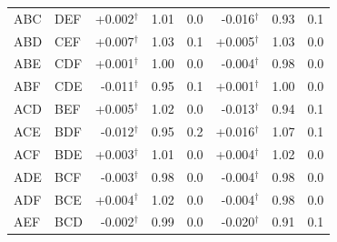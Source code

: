\begin{tabular}{@{}llrrrrrr@{}}
ABC & DEF & +0.002$^\dagger$ & 1.01 & 0.0 & -0.016$^\dagger$ & 0.93 & 0.1 \\
ABD & CEF & +0.007$^\dagger$ & 1.03 & 0.1 & +0.005$^\dagger$ & 1.03 & 0.0 \\
ABE & CDF & +0.001$^\dagger$ & 1.00 & 0.0 & -0.004$^\dagger$ & 0.98 & 0.0 \\
ABF & CDE & -0.011$^\dagger$ & 0.95 & 0.1 & +0.001$^\dagger$ & 1.00 & 0.0 \\
ACD & BEF & +0.005$^\dagger$ & 1.02 & 0.0 & -0.013$^\dagger$ & 0.94 & 0.1 \\
ACE & BDF & -0.012$^\dagger$ & 0.95 & 0.2 & +0.016$^\dagger$ & 1.07 & 0.1 \\
ACF & BDE & +0.003$^\dagger$ & 1.01 & 0.0 & +0.004$^\dagger$ & 1.02 & 0.0 \\
ADE & BCF & -0.003$^\dagger$ & 0.98 & 0.0 & -0.004$^\dagger$ & 0.98 & 0.0 \\
ADF & BCE & +0.004$^\dagger$ & 1.02 & 0.0 & -0.004$^\dagger$ & 0.98 & 0.0 \\
AEF & BCD & -0.002$^\dagger$ & 0.99 & 0.0 & -0.020$^\dagger$ & 0.91 & 0.1 \\
\bottomrule
\end{tabular}
